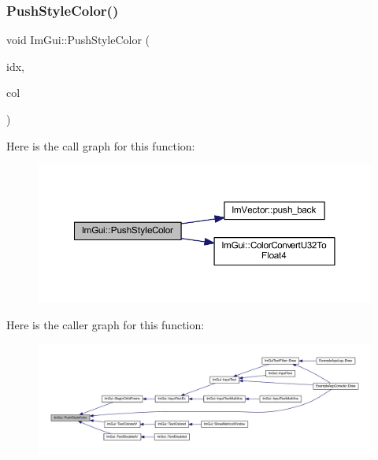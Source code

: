 \subsubsection{\texorpdfstring{Push\+Style\+Color()}{PushStyleColor()}\hspace{0.1cm}{\footnotesize\ttfamily [1/2]}}
{\footnotesize\ttfamily void Im\+Gui\+::\+Push\+Style\+Color (\begin{DoxyParamCaption}\item[{\mbox{\hyperlink{imgui_8h_a1b0467ec582e731ae6292fef726fb5fe}{Im\+Gui\+Col}}}]{idx,  }\item[{\mbox{\hyperlink{imgui_8h_a118cff4eeb8d00e7d07ce3d6460eed36}{Im\+U32}}}]{col }\end{DoxyParamCaption})}

Here is the call graph for this function\+:
\nopagebreak
\begin{figure}[H]
\begin{center}
\leavevmode
\includegraphics[width=350pt]{namespace_im_gui_a77ee84afb636e05eb4b2d6eeddcc2aa8_cgraph}
\end{center}
\end{figure}
Here is the caller graph for this function\+:
\nopagebreak
\begin{figure}[H]
\begin{center}
\leavevmode
\includegraphics[width=350pt]{namespace_im_gui_a77ee84afb636e05eb4b2d6eeddcc2aa8_icgraph}
\end{center}
\end{figure}
\mbox{\label{namespace_im_gui_a5bd052ebf55015312a53739974950e7b}} 
